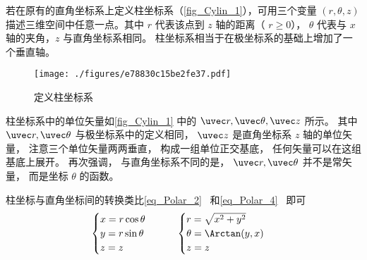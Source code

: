 
若在原有的直角坐标系上定义柱坐标系（\autoref{fig_Cylin_1}），可用三个变量 $(r, \theta, z)$ 描述三维空间中任意一点。其中 $r$ 代表该点到 $z$ 轴的距离（ $r \geqslant 0$）， $\theta$ 代表与 $x$ 轴的夹角，$z$ 与直角坐标系相同。 柱坐标系相当于在极坐标系的基础上增加了一个垂直轴。

\begin{figure}[ht]
\centering
\texttt{[image: ./figures/e78830c15be2fe37.pdf]}
\caption{定义柱坐标系}\label{fig_Cylin_1}
\end{figure}

柱坐标系中的单位矢量如\autoref{fig_Cylin_1} 中的 $\uvec r,\uvec \theta ,\uvec z$ 所示。 其中 $\uvec r, \uvec \theta$ 与极坐标系中的定义相同， $\uvec z$ 是直角坐标系 $z$ 轴的单位矢量， 注意三个单位矢量两两垂直， 构成一组单位正交基底， 任何矢量可以在这组基底上展开。 再次强调， 与直角坐标系不同的是， $\uvec r, \uvec \theta$ 并不是常矢量， 而是坐标 $\theta$ 的函数。

柱坐标与直角坐标间的转换类比\autoref{eq_Polar_2}~ 和\autoref{eq_Polar_4}~ 即可
\begin{equation}
\begin{cases}
x = r\cos \theta \\
y = r\sin \theta \\
z = z
\end{cases}
\qquad
\begin{cases}
r = \sqrt {x^2 + y^2} \\
\theta  = \Arctan(y, x)\\
z = z
\end{cases}
\end{equation}
